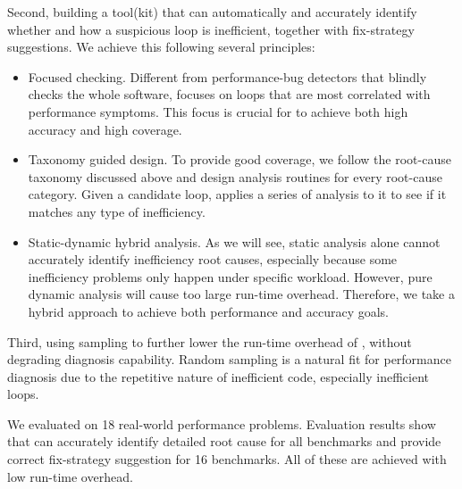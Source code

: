Second, building a tool(kit) \Tool that can automatically and accurately
identify whether and how a suspicious loop is inefficient, 
together with fix-strategy suggestions. 
We achieve this following several principles:

\begin{itemize}
\item Focused checking. 
Different from performance-bug detectors that blindly checks the whole
software, \Tool focuses on loops that are
most correlated with performance symptoms. 
This focus is crucial for \Tool to achieve both high
accuracy and high coverage.

\item Taxonomy guided design. To provide good coverage, we follow
the root-cause taxonomy discussed above and design analysis routines for
every root-cause category. Given a candidate loop, \Tool
applies a series of analysis to it to see if it matches any type of inefficiency.

\item Static-dynamic hybrid analysis.
As we will see, static analysis alone cannot accurately identify 
inefficiency root causes, especially because some inefficiency problems only
happen under specific workload. However, pure dynamic analysis will 
cause too large 
run-time overhead. Therefore, we take a hybrid approach to achieve both
performance and accuracy goals.
\end{itemize}

Third, using sampling to further lower the run-time overhead of \Tool, without
degrading diagnosis capability. Random sampling is a natural fit for performance
diagnosis due to the repetitive nature of inefficient code, especially
inefficient loops.

We evaluated \Tool on 18 real-world performance problems. 
Evaluation results show that \Tool can accurately identify detailed
root cause for all benchmarks and provide correct fix-strategy suggestion for
16 benchmarks. All of these are achieved with low run-time overhead.
